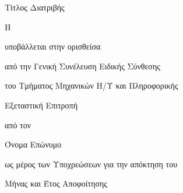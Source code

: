 \thispagestyle{empty}
\begin{center}
	{\LARGE Τίτλος Διατριβής}
	\par
	\vspace{2.5cm} {\Large Η \csethesisTypeEl}
	
	\vspace{1.25cm} {\Large υποβάλλεται στην ορισθείσα}
	
	\vspace{0.75cm} {\Large από την Γενική Συνέλευση Ειδικής Σύνθεσης}
	
	\vspace{0.25cm} {\Large του Τμήματος Μηχανικών Η/Υ και Πληροφορικής}
	
	\vspace{0.25cm} {\Large Εξεταστική Επιτροπή}
	
	\vspace{1.25cm} {\Large από τον}
	
	\vspace{1.75cm} {\LARGE Όνομα Επώνυμο}
	
	\vspace{1.25cm} {\Large ως μέρος των Υποχρεώσεων για την απόκτηση του}
	
	\vspace{1.75cm} {\Large \csediplwmaEl}
	
	\vspace{0.5cm} {\Large \csesubjectEl}
	
	\vspace{0.5cm} {\Large \cseexpertiseEl}
	\par
	\vfill {\Large Μήνας και Έτος Αποφοίτησης}
\end{center}